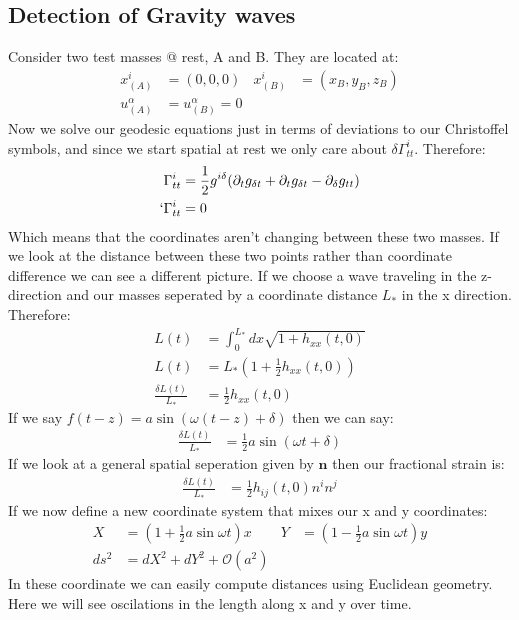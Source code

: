  \subsection{Detection of Gravity waves}
 Consider two test masses @ rest, A and B. They are located at:
 \begin{align*}
	 x_{(A)}^i &= (0,0,0) & x_{(B)}^i &= (x_B,y_B,z_B) \\
	 u_{(A)}^\alpha &= u_{(B)}^\alpha = 0
 \end{align*}
 Now we solve our geodesic equations just in terms of deviations to our Christoffel symbols, and since we start spatial at rest we only care about $\delta \Gamma^i_{tt}$. Therefore:
 \begin{align*}
	 \Gamma^i_{tt} &= \frac{1}{2} g^{i\delta}( \partial_t g_{\delta t} + \partial_t g_{\delta t} - \partial_\delta g_{tt}) \\`
	 \Gamma^i_{tt} &= 0
 \end{align*}
 Which means that the coordinates aren't changing between these two masses. If we look at the distance between these two points rather than coordinate difference we can see a different picture.
 If we choose a wave traveling in the z-direction and our masses seperated by a coordinate distance $L_*$ in the x direction. Therefore:
 \begin{align*}
	 L(t) &= \int_0^{L_*} dx \sqrt{1 + h_{xx}(t,0)} \\
	 L(t) &= L_* (1 + \frac{1}{2}h_{xx}(t,0)) \\
	 \frac{\delta L(t)}{L_*} &= \frac{1}{2}h_{xx}(t,0)
 \end{align*}
 If we say $f(t-z) = a\sin(\omega(t-z) + \delta)$ then we can say:
 \begin{align*}
	 \frac{\delta L(t)}{L_*} &= \frac{1}{2}a\sin(\omega t + \delta)
 \end{align*}
 If we look at a general spatial seperation given by $\bm{n}$ then our fractional strain is:
 \begin{align*}
	 \frac{\delta L(t)}{L_*} &= \frac{1}{2}h_{ij}(t,0) n^i n^j
 \end{align*}
 If we now define a new coordinate system that mixes our x and y coordinates:
 \begin{align*}
	 X &= (1 + \frac{1}{2} a\sin\omega t)x & Y &= (1- \frac{1}{2} a\sin\omega t)y \\
	 ds^2 &= dX^2 + dY^2 + \mathcal{O}(a^2)
 \end{align*}
 In these coordinate we can easily compute distances using Euclidean geometry. Here we will see oscilations in the length along x and y over time.
